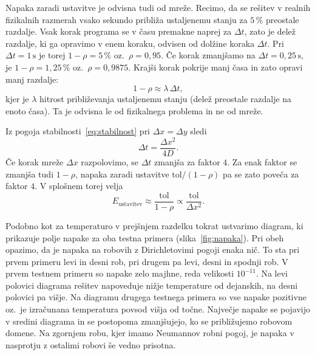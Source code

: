 \documentclass[a4paper,11pt]{article}
\begin{document}
	Napaka zaradi ustavitve je odvisna tudi od mreže. Recimo, da se rešitev v realnih fizikalnih razmerah vsako sekundo približa ustaljenemu stanju za $5\,\%$ preostale razdalje. Vsak korak programa se v času premakne naprej za $\Delta t$, zato je delež razdalje, ki ga opravimo v enem koraku, odvisen od dolžine koraka $\Delta t$. Pri $\Delta t = 1\,\text{s}$ je torej $1-\rho = 5\,\%$ oz.\ $\rho = 0{,}95$. Če korak zmanjšamo na $\Delta t = 0{,}25\,\text{s}$, je $1-\rho = 1{,}25\,\%$ oz.\ $\rho = 0{,}9875$. Krajši korak pokrije manj časa in zato opravi manj razdalje:
	\begin{equation}
		1 - \rho \approx \lambda\,\Delta t,
	\end{equation}
	kjer je $\lambda$ hitrost približevanja ustaljenemu stanju (delež preostale razdalje na enoto časa). Ta je odvisna le od fizikalnega problema in ne od mreže.
	
	Iz pogoja stabilnosti~\eqref{eq:stabilnost} pri $\Delta x = \Delta y$ sledi
	\begin{equation}
		\Delta t = \frac{\Delta x^2}{4D}.
	\end{equation}
	Če korak mreže $\Delta x$ razpolovimo, se $\Delta t$ zmanjša za faktor $4$. Za enak faktor se zmanjša tudi $1-\rho$, napaka zaradi ustavitve $\text{tol}/(1-\rho)$ pa se zato poveča za faktor $4$. V splošnem torej velja
	\begin{equation}
		E_{\text{ustavitev}} \approx \frac{\text{tol}}{1-\rho} \propto \frac{\text{tol}}{\Delta x^2}.
		\label{eq:ustavitev_mreza}
	\end{equation}
	
	Podobno kot za temperaturo v prejšnjem razdelku tokrat ustvarimo diagram, ki prikazuje polje napake za oba testna primera (slika~\ref{fig:napaka}). Pri obeh opazimo, da je napaka na robovih z Dirichletovimi pogoji enaka nič. To sta pri prvem primeru levi in desni rob, pri drugem pa levi, desni in spodnji rob. V prvem testnem primeru so napake zelo majhne, reda velikosti $10^{-11}$. Na levi polovici diagrama rešitev napoveduje nižje temperature od dejanskih, na desni polovici pa višje. Na diagramu drugega testnega primera so vse napake pozitivne oz.\ je izračunana temperatura povsod višja od točne. Največje napake se pojavijo v sredini diagrama in se postopoma zmanjšujejo, ko se približujemo robovom domene. Na zgornjem robu, kjer imamo Neumannov robni pogoj, je napaka v nasprotju z ostalimi robovi še vedno prisotna.
	
\end{document}
